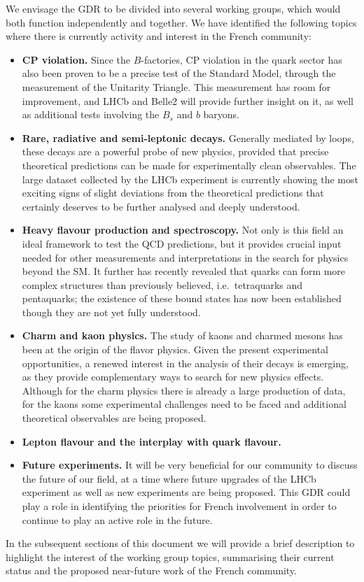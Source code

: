 We envisage the GDR to be divided into several working groups, which would both function independently and together. We have identified the following topics where there is currently activity and interest in the French community:
\begin{itemize}
\item {\bf CP violation.}  Since the $B$-factories, CP violation in the quark sector has also been proven to be a precise test of the Standard Model, through the measurement of the Unitarity Triangle. This measurement has room for improvement, and LHCb and Belle2 will provide further insight on it, as well as additional tests involving the  $B_s$ and $b$ baryons. 
\item {\bf Rare, radiative and semi-leptonic decays.} Generally mediated by loops, these decays are a powerful probe of new physics, provided that precise theoretical predictions can be made for experimentally clean observables. The large dataset collected by the LHCb experiment is currently showing the most exciting signs of slight deviations from the theoretical predictions that certainly deserves to be further analysed and deeply understood. 
\item {\bf Heavy flavour production and spectroscopy.} Not only is this field an ideal framework to test the QCD predictions, but it provides crucial input needed for other measurements and interpretations in the search for physics beyond the SM.  It further has recently revealed that quarks can form more complex structures than previously believed, i.e.~tetraquarks and pentaquarks; the existence of these bound states has now been established though they are not yet fully understood. 
\item {\bf Charm and kaon physics.} The study of kaons and charmed mesons has been at the origin of the flavor physics. Given the present experimental opportunities, a renewed interest in the analysis of their decays is emerging, as they provide complementary ways to search for new physics effects.   Although for the charm physics there is already a large production of data, for the kaons some experimental challenges need to be faced and additional theoretical observables are being proposed.  
\item {\bf Lepton flavour and the interplay with quark flavour. } 
\item {\bf Future experiments.} It will be very beneficial for our community to discuss the future of our field, at a time where future upgrades of the LHCb experiment as well as new experiments are being proposed. This GDR could play a role in identifying the priorities for French involvement in order to continue to play an active role in the future. 
\end{itemize}
In the subsequent sections of this document we will provide a brief description to highlight  the interest of the working group topics,  summarising their  current status and the proposed near-future work of the French community. 

